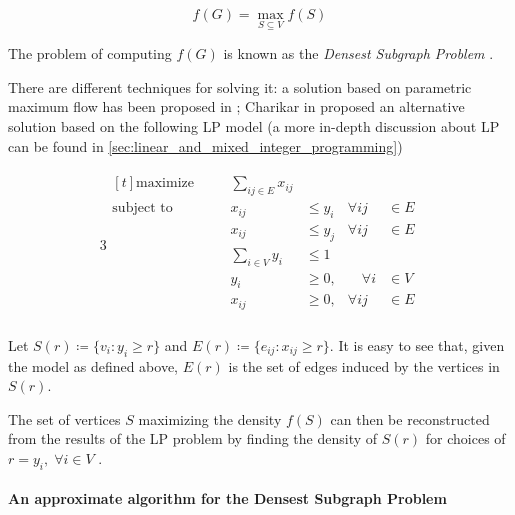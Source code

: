 \begin{equation}
	f(G) = \max_{S \subseteq V} {f(S)}
\end{equation}

The problem of computing $f(G)$ is known as the \emph{Densest Subgraph Problem}
\cite{charikar2000greedy}.

There are different techniques for solving it: a solution based on parametric
maximum flow has been proposed in \cite{Gallo1989}; Charikar in
\cite{charikar2000greedy} proposed an alternative solution based on the
following \acrlong{LP} model (a more in-depth discussion about \acrshort{LP}
can be found in \autoref{sec:linear_and_mixed_integer_programming})

\begin{alignat}{3}
	\label{eq:charikar-model-densest-subgraph}
	\begin{aligned}[t]
		\text{maximize}   &       & \sum_{ij \in E} x_{ij}                 \\
		\text{subject to} & \quad & x_{ij}                  & \leq y_{i} &
		\forall ij        & \in E                                          \\
		                  &       & x_{ij}                  & \leq y_{j} &
		\forall ij        & \in E                                          \\
		                  &       & \sum^{}_{i \in V} y_{i} & \leq 1     & \\
		                  &       & y_{i}                   & \geq 0,    &
		\quad \forall i   & \in V                                          \\
		                  &       & x_{ij}                  & \geq 0,    &
		\forall ij        & \in E                                          \\
	\end{aligned}
\end{alignat}

Let $S(r) \coloneqq \{v_{i} : y_{i} \geq r\} $ and $E(r) \coloneqq \{e_{ij} :
	x_{ij} \geq r\} $. It is easy to see that, given the model as defined
above, $E(r)$ is the set of edges induced by the vertices in $S(r)$.

The set of vertices $S$ maximizing the density $f(S)$ can then be reconstructed
from the results of the \acrshort{LP} problem by finding the density of $S(r)$
for choices of $r = y_{i}, \; \forall i \in V $ \cite{charikar2000greedy}.

\paragraph{An approximate algorithm for the Densest Subgraph Problem}%
\label{par:an_approximate_algorithm_for_the_densest_subgraph_problem}

